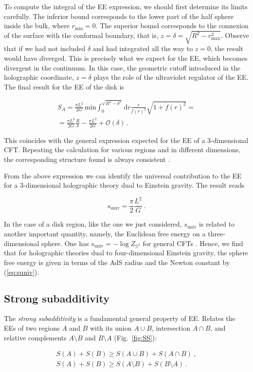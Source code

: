 \documentclass[twocolumn]{revtex4}
\providecommand{\eq}[2]{
    \begin{equation}
        #2
    \label{eq:#1}
    \end{equation}
}
\providecommand{\eqgat}[2]{
    \begin{gather}
        #2
    \label{eq:#1}
    \end{gather}
}
\begin{document}
To compute the integral of the EE expression, we should first determine its limits carefully. The inferior bound corresponds to the lower part of the half sphere inside the bulk, where $r_\text{min}=0$. The superior bound corresponds to the connexion of the surface with the conformal boundary, that is, $z=\delta=\sqrt{R^2-r_\text{max}^2}$. Observe that if we had not included $\delta$ and had integrated all the way to $z=0$, the result would have diverged. This is precisely what we expect for the EE, which becomes divergent in the continuum. In this case, the geometric cutoff introduced in the holographic coordinate, $z=\delta$ plays the role of the ultraviolet regulator of the EE. The final result for the EE of the disk is 
\eqgat{1sol}{
    S_A = \frac{\pi L^2}{2G} \, \text{min} \int_0^{\sqrt{R^2-\delta^2}} \mathrm{d}r \frac{r}{f(r)^2} \sqrt{ 1 + \dot{f}(r)^2 } = \nonumber \\
    = \frac{\pi L^2}{2G} \frac{R}{\delta} - \frac{\pi L^2}{2G}+\mathcal{O}(\delta) \, . \nonumber
}
This coincides with the general expression expected for the EE of  a 3-dimensional CFT. Repeating the calculation for various regions and in different dimensions, the corresponding structure found is always consistent \cite{ryu_aspects_2006,ryu_holographic_2008}. 

From the above expression we can identify the universal contribution to the EE for a 3-dimensional holographic theory dual to Einstein gravity. The result reads
\eq{suniv}{
     s_\text{univ} = \frac{\pi}{2} \frac{L^2}{G} \ .
}

In the case of a disk region, like the one we just considered, $s_\text{univ}$ is related to another important quantity, namely, the Euclidean free energy on a three-dimensional sphere. One has $s_\text{univ}= -\log Z_{\mathbb{S}^3}$ for general CFTs \cite{casini_towards_2011}. Hence, we find that for holographic theories dual to four-dimensional Einstein gravity, the sphere free energy is given in terms of the AdS radius and the Newton constant by (\ref{eq:suniv}).


\subsection{Strong subadditivity} \label{ss:SS}

The \emph{strong subadditivity} \cite{headrick_holographic_2007} is a fundamental general property of EE. Relates the EEs of two regions $A$ and $B$ with its union $A \cup B$, intersection $A \cap B$, and relative complements $A \setminus B$ and $B \setminus A$ (Fig.~\ref{fig:SS}):
\eqgat{EE_strong-subadd}{
    S(A) + S(B) \ge S(A \cup B) + S(A \cap B) \ , \nonumber \\
    S(A) + S(B) \ge S(A \setminus B) + S(B \setminus A) \ .
}
\end{document}
